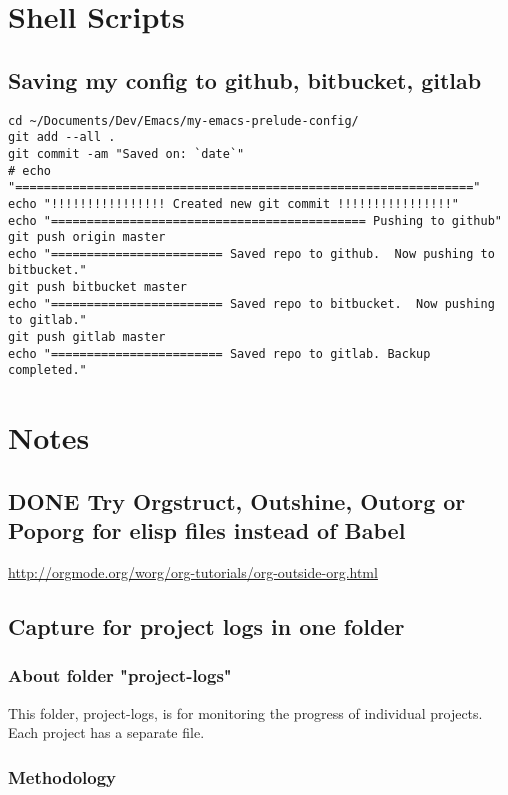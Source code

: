 \documentclass{article}
\begin{document}
\section{Shell Scripts}
\label{sec-4}

\subsection{Saving my config to github, bitbucket, gitlab}
\label{sec-4-1}

\begin{verbatim}
cd ~/Documents/Dev/Emacs/my-emacs-prelude-config/
git add --all .
git commit -am "Saved on: `date`"
# echo "================================================================"
echo "!!!!!!!!!!!!!!!! Created new git commit !!!!!!!!!!!!!!!!"
echo "============================================ Pushing to github"
git push origin master
echo "======================== Saved repo to github.  Now pushing to bitbucket."
git push bitbucket master
echo "======================== Saved repo to bitbucket.  Now pushing to gitlab."
git push gitlab master
echo "======================== Saved repo to gitlab. Backup completed."
\end{verbatim}
\section{Notes}
\label{sec-5}
\subsection{{\bfseries\sffamily DONE} Try Orgstruct, Outshine, Outorg or Poporg for elisp files instead of Babel}
\label{sec-5-1}

\url{http://orgmode.org/worg/org-tutorials/org-outside-org.html}
\subsection{Capture for project logs in one folder}
\label{sec-5-2}

\subsubsection{About folder "project-logs"}
\label{sec-5-2-1}

This folder, project-logs, is for monitoring the progress of individual projects.  Each project has a separate file.

\subsubsection{Methodology}
\label{sec-5-2-2}
\end{document}
